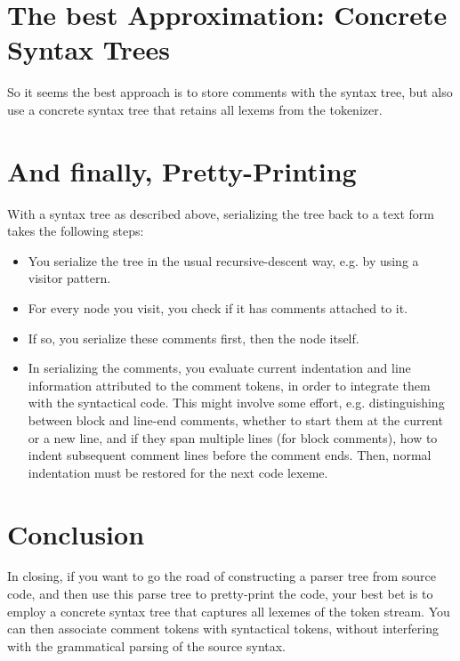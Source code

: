 \documentclass[11pt,a4paper]{article}
\begin{document}
\section{The best Approximation: Concrete Syntax Trees}

So it seems the best approach is to store comments with the syntax tree, but
also use a concrete syntax tree that retains all lexems from the tokenizer. 

\section{And finally, Pretty-Printing}

With a syntax tree as described above, serializing the tree back to a text form
takes the following steps:

\begin{itemize}
\item You serialize the tree in the usual recursive-descent way, e.g. by using a
visitor pattern.
\item For every node you visit, you check if it has comments attached to it.
\item If so, you serialize these comments first, then the node itself.
\item In serializing the comments, you evaluate current indentation and line
information attributed to the comment tokens, in order to integrate them with
the syntactical code. This might involve some effort, e.g. distinguishing
between block and line-end comments, whether to start them at the current or a
new line, and if they span multiple lines (for block comments), how to indent
subsequent comment lines before the comment ends. Then, normal indentation
must be restored for the next code lexeme.
\end{itemize}

\section{Conclusion}

In closing, if you want to go the road of constructing a parser tree from source
code, and then use this parse tree to pretty-print the code, your best bet is to
employ a concrete syntax tree that captures all lexemes of the token stream. You
can then associate comment tokens with syntactical tokens, without interfering
with the grammatical parsing of the source syntax. 




\end{document}
